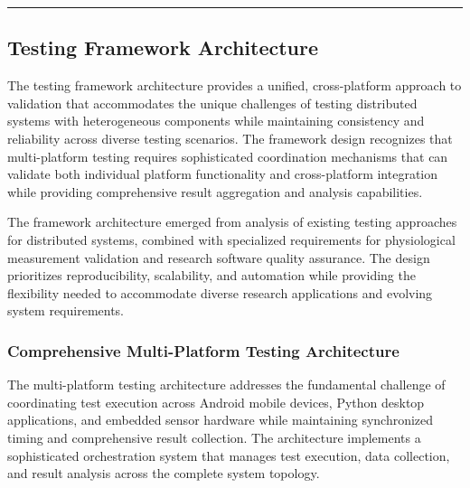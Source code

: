 \documentclass[12pt,a4paper]{report}
\begin{document}
\hrule

\subsection{Testing Framework Architecture}

The testing framework architecture provides a unified, cross-platform approach to validation that accommodates the
unique challenges of testing distributed systems with heterogeneous components while maintaining consistency and
reliability across diverse testing scenarios. The framework design recognizes that multi-platform testing requires
sophisticated coordination mechanisms that can validate both individual platform functionality and cross-platform
integration while providing comprehensive result aggregation and analysis capabilities.

The framework architecture emerged from analysis of existing testing approaches for distributed systems, combined with
specialized requirements for physiological measurement validation and research software quality assurance. The design
prioritizes reproducibility, scalability, and automation while providing the flexibility needed to accommodate diverse
research applications and evolving system requirements.

\subsubsection{Comprehensive Multi-Platform Testing Architecture}

The multi-platform testing architecture addresses the fundamental challenge of coordinating test execution across
Android mobile devices, Python desktop applications, and embedded sensor hardware while maintaining synchronized timing
and comprehensive result collection. The architecture implements a sophisticated orchestration system that manages test
execution, data collection, and result analysis across the complete system topology.
\end{document}
